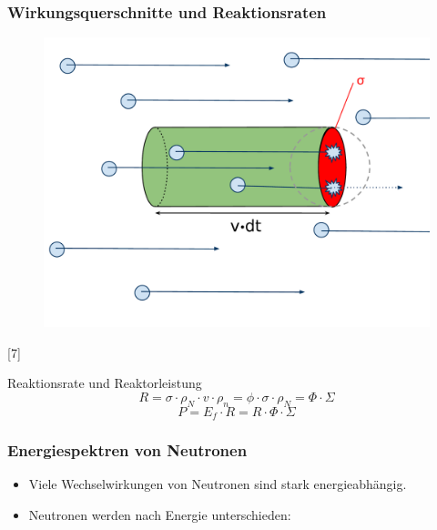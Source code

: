 \documentclass{beamer}[9pt]
\begin{document}
\begin{frame}
\frametitle{Wirkungsquerschnitte und Reaktionsraten}


\begin{figure}
\centering
\includegraphics[scale=0.18]{crossection.pdf}
\end{figure}
\vspace{-.5em}
\hspace{.5\columnwidth}[7]
\begin{block}{Reaktionsrate und Reaktorleistung}
\[
R =  \sigma \cdot \rho_N \cdot v \cdot \rho_n= \phi \cdot \sigma \cdot \rho_N = \Phi \cdot \Sigma
\]
\[
P = E_f \cdot R = R \cdot \Phi \cdot \Sigma
\]
\end{block}

\end{frame}

\begin{frame}
\frametitle{Energiespektren von Neutronen}
\begin{itemize}
\item Viele Wechselwirkungen von Neutronen sind stark energieabhängig.
\item Neutronen werden nach Energie unterschieden:
\end{itemize}
\end{frame}
\end{document}
